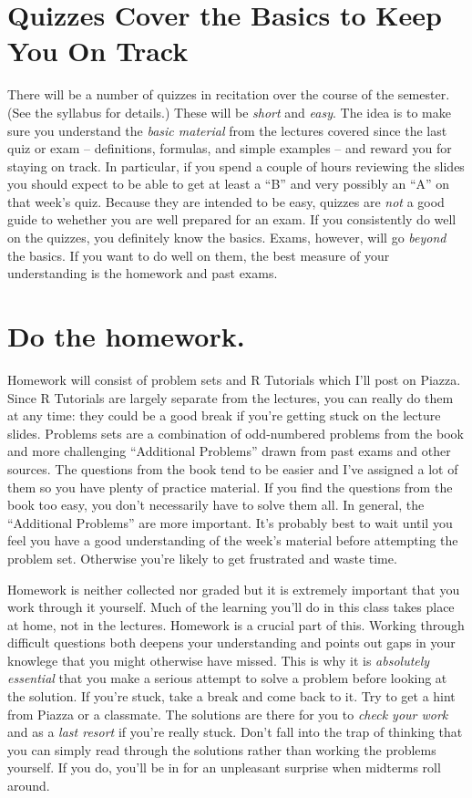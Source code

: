 \documentclass[12pt,letterpaper]{article}
\begin{document}
\section{Quizzes Cover the Basics to Keep You On Track}
There will be a number of quizzes in recitation over the course of the semester.
(See the syllabus for details.)
These will be \emph{short} and \emph{easy}.
The idea is to make sure you understand the \emph{basic material} from the lectures covered since the last quiz or exam -- definitions, formulas, and simple examples -- and reward you for staying on track.
In particular, if you spend a couple of hours reviewing the slides you should expect to be able to get at least a ``B'' and very possibly an ``A'' on that week's quiz.
Because they are intended to be easy, quizzes are \emph{not} a good guide to wehether you are well prepared for an exam.
If you consistently do well on the quizzes, you definitely know the basics.
Exams, however, will go \emph{beyond} the basics.
If you want to do well on them, the best measure of your understanding is the homework and past exams.


\section{Do the homework.}
Homework will consist of problem sets and R Tutorials which I'll post on Piazza. 
Since R Tutorials are largely separate from the lectures, you can really do them at any time: they could be a good break if you're getting stuck on the lecture slides.
Problems sets are a combination of odd-numbered problems from the book and more challenging ``Additional Problems'' drawn from past exams and other sources. 
The questions from the book tend to be easier and I've assigned a lot of them so you have plenty of practice material.
If you find the questions from the book too easy, you don't necessarily have to solve them all.
In general, the ``Additional Problems'' are more important.
It's probably best to wait until you feel you have a good understanding of the week's material before attempting the problem set. 
Otherwise you're likely to get frustrated and waste time.

Homework is neither collected nor graded but it is extremely important that you work through it yourself. 
Much of the learning you'll do in this class takes place at home, not in the lectures.
Homework is a crucial part of this.
Working through difficult questions both deepens your understanding and points out gaps in your knowlege that you might otherwise have missed.
This is why it is \emph{absolutely essential} that you make a serious attempt to solve a problem before looking at the solution.
If you're stuck, take a break and come back to it.
Try to get a hint from Piazza or a classmate.
The solutions are there for you to \emph{check your work} and as a \emph{last resort} if you're really stuck.
Don't fall into the trap of thinking that you can simply read through the solutions rather than working the problems yourself.
If you do, you'll be in for an unpleasant surprise when midterms roll around.
\end{document}
